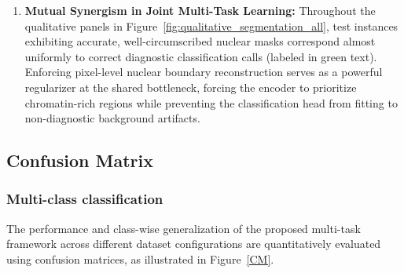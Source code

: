 \documentclass[pdflatex,sn-nature]{sn-jnl}%
\theoremstyle{thmstyleone}%
\theoremstyle{thmstyletwo}%
\theoremstyle{thmstylethree}%
\begin{document}
\begin{enumerate}
    \item \textbf{Mutual Synergism in Joint Multi-Task Learning:}
    Throughout the qualitative panels in Figure~\ref{fig:qualitative_segmentation_all}, test instances exhibiting accurate, well-circumscribed nuclear masks correspond almost uniformly to correct diagnostic classification calls (labeled in green text). Enforcing pixel-level nuclear boundary reconstruction serves as a powerful regularizer at the shared bottleneck, forcing the encoder to prioritize chromatin-rich regions while preventing the classification head from fitting to non-diagnostic background artifacts.
\end{enumerate}

\subsection{Confusion Matrix}

\subsubsection{Multi-class classification}

The performance and class-wise generalization of the proposed multi-task framework across different dataset configurations are quantitatively evaluated using confusion matrices, as illustrated in Figure~\ref{CM}.  
\end{document}
